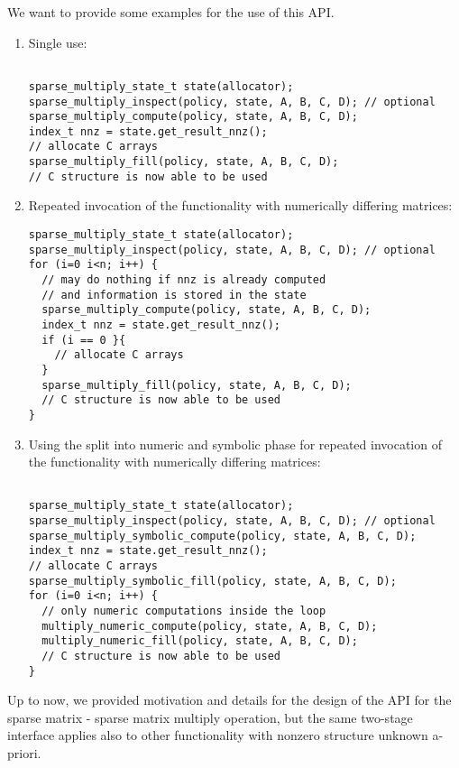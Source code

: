 \documentclass{article}
\begin{document}
We want to provide some examples for the use of this API. 
\begin{enumerate}
    \item Single use:
\begin{verbatim}

sparse_multiply_state_t state(allocator);
sparse_multiply_inspect(policy, state, A, B, C, D); // optional
sparse_multiply_compute(policy, state, A, B, C, D);
index_t nnz = state.get_result_nnz();
// allocate C arrays 
sparse_multiply_fill(policy, state, A, B, C, D);
// C structure is now able to be used
\end{verbatim}
\item 
Repeated invocation of the functionality with numerically differing matrices:
\begin{verbatim}
sparse_multiply_state_t state(allocator);
sparse_multiply_inspect(policy, state, A, B, C, D); // optional
for (i=0 i<n; i++) {
  // may do nothing if nnz is already computed
  // and information is stored in the state
  sparse_multiply_compute(policy, state, A, B, C, D);
  index_t nnz = state.get_result_nnz();
  if (i == 0 }{
    // allocate C arrays 
  }
  sparse_multiply_fill(policy, state, A, B, C, D);
  // C structure is now able to be used
}
\end{verbatim}
\item 
Using the split into numeric and symbolic phase for repeated invocation of the functionality with numerically differing matrices:
\begin{verbatim}

sparse_multiply_state_t state(allocator);
sparse_multiply_inspect(policy, state, A, B, C, D); // optional
sparse_multiply_symbolic_compute(policy, state, A, B, C, D);
index_t nnz = state.get_result_nnz();
// allocate C arrays 
sparse_multiply_symbolic_fill(policy, state, A, B, C, D);
for (i=0 i<n; i++) {
  // only numeric computations inside the loop
  multiply_numeric_compute(policy, state, A, B, C, D);
  multiply_numeric_fill(policy, state, A, B, C, D);
  // C structure is now able to be used
}
\end{verbatim}
\end{enumerate}




Up to now, we provided motivation and details for the design of the API for the sparse matrix - sparse matrix multiply operation, but the same two-stage interface applies also to other functionality with nonzero structure unknown a-priori.
\end{document}
